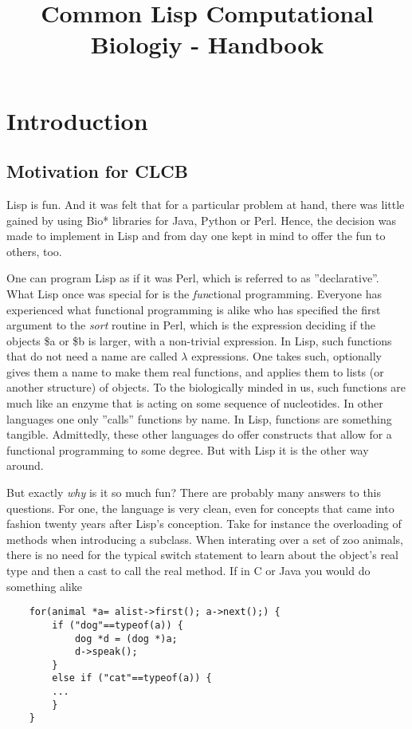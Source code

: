 \documentclass{book}
\title{Common Lisp Computational Biologiy - Handbook}
\begin{document}
\titlepage

\chapter{Introduction}


\section{Motivation for CLCB}

Lisp is fun. And it was felt that for a particular problem at hand, 
there was little gained by using Bio* libraries for Java, Python or Perl.
Hence, the decision was made to implement in Lisp and from day one kept in
mind to offer the fun to others, too.

One can program Lisp as if it was Perl, which is referred to as
''declarative''. What Lisp once was special for is the {\em fun}ctional
programming. Everyone has experienced what functional programming is alike
who has specified the first argument to the {\em sort} routine in Perl,
which is the expression deciding if the objects \$a or \$b is larger, with
a non-trivial expression.  In Lisp,
such functions that do not need a name are called $\lambda$ expressions.
One takes such, optionally gives them a name to make them real functions,
and applies them to lists (or another structure) of objects. To the biologically minded in us,
such functions are much like an enzyme that is acting on some sequence of
nucleotides. In other languages one only ''calls'' functions by name. In Lisp, functions are something tangible. Admittedly, these other languages do offer constructs that allow for a functional
programming to some degree. But with Lisp it is the other way around.

But exactly {\em why} is it so much fun? There are probably many answers
to this questions.  For one, the language is very clean, even for concepts
that came into fashion twenty years after Lisp's conception. Take
for instance the overloading of methods when introducing a subclass.
When interating over a set of zoo animals, there is no need for the
typical switch statement to learn about the object's real type and then a
cast to call the real method. If in C or Java you would do something alike

\lstset{language=C}
\begin{lstlisting}
	for(animal *a= alist->first(); a->next();) {
		if ("dog"==typeof(a)) {
			dog *d = (dog *)a;
			d->speak();
		}
		else if ("cat"==typeof(a)) {
		...
		}
	}
\end{lstlisting}
\end{document}
